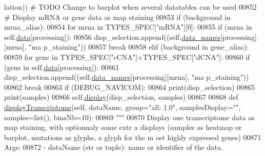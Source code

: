 \begin{DoxyCode}
      lation)) \textcolor{comment}{# TODO Change to barplot when several datatables can be used}
00852         \textcolor{comment}{# Display mRNA or gene data as map staining}
00853         \textcolor{keywordflow}{if} (background \textcolor{keywordflow}{in} mrna\_alias):
00854             \textcolor{keywordflow}{for} mrna \textcolor{keywordflow}{in} TYPES\_SPEC[\textcolor{stringliteral}{"mRNA"}][0]:
00855                 \textcolor{keywordflow}{if} (mrna \textcolor{keywordflow}{in} self.\hyperlink{classnavicom_1_1navicom_1_1NaviCom_aa1abff245573ed8406c6bddb4596f093}{data}[processing]):
00856                     disp\_selection.append((self.\hyperlink{classnavicom_1_1navicom_1_1NaviCom_a68646454fe1481b0065d2f43548319df}{data_names}[processing][mrna], \textcolor{stringliteral}{"ma
      p\_staining"}))
00857                     \textcolor{keywordflow}{break}
00858         \textcolor{keywordflow}{elif} (background \textcolor{keywordflow}{in} gene\_alias):
00859             \textcolor{keywordflow}{for} gene \textcolor{keywordflow}{in} TYPES\_SPEC[\textcolor{stringliteral}{"cCNA"}]+TYPES\_SPEC[\textcolor{stringliteral}{"dCNA"}]:
00860                 \textcolor{keywordflow}{if} (gene \textcolor{keywordflow}{in} self.\hyperlink{classnavicom_1_1navicom_1_1NaviCom_aa1abff245573ed8406c6bddb4596f093}{data}[processing]):
00861                     disp\_selection.append((self.\hyperlink{classnavicom_1_1navicom_1_1NaviCom_a68646454fe1481b0065d2f43548319df}{data_names}[processing][mrna], \textcolor{stringliteral}{"ma
      p\_staining"}))
00862                     \textcolor{keywordflow}{break}
00863         \textcolor{keywordflow}{if} (DEBUG\_NAVICOM):
00864             \textcolor{keywordflow}{print}(disp\_selection)
00865             \textcolor{keywordflow}{print}(samples)
00866         self.\hyperlink{classnavicom_1_1navicom_1_1NaviCom_ad7d4390d700d4a6d2533647887f8ab94}{display}(disp\_selection, samples)
00867 
00868     \textcolor{keyword}{def }\hyperlink{classnavicom_1_1navicom_1_1NaviCom_a001dadf6f3dc0c77ba5b14da621b110d}{displayTranscriptome}(self, dataName, group="all: 1.0\textcolor{stringliteral}{", samplesDisplay="}\textcolor{stringliteral}{",
       samples=list(), binsNb=10):}
00869 \textcolor{stringliteral}{        }\textcolor{stringliteral}{"""}
00870 \textcolor{stringliteral}{        Display one transcriptome data as map staining, with optionnaly some extr
      a displays (samples as heatmap or barplot, mutations as glyphs, a glyph for the m
      ost highly expressed genes)}
00871 \textcolor{stringliteral}{        Args:}
00872 \textcolor{stringliteral}{            - dataName (str or tuple): name or identifier of the data.}

\end{DoxyCode}
